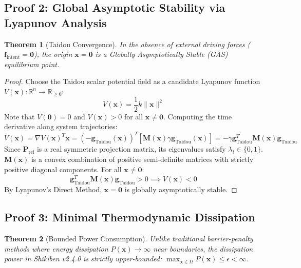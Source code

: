 \documentclass[11pt,a4paper]{article}
\newtheorem{theorem}{Theorem}
\begin{document}
\hr

\subsection{Proof 2: Global Asymptotic Stability via Lyapunov Analysis}

\begin{theorem}[Taidou Convergence]
In the absence of external driving forces ($\mathbf{f}_{\text{intent}} = \mathbf{0}$), the origin $\mathbf{x} = \mathbf{0}$ is a Globally Asymptotically Stable (GAS) equilibrium point.
\end{theorem}

\begin{proof}
Choose the Taidou scalar potential field as a candidate Lyapunov function $V(\mathbf{x}): \mathbb{R}^n \to \mathbb{R}_{\ge 0}$:
\begin{equation}
V(\mathbf{x}) = \frac{1}{2} k \|\mathbf{x}\|^2
\end{equation}
Note that $V(\mathbf{0}) = 0$ and $V(\mathbf{x}) > 0$ for all $\mathbf{x} \neq \mathbf{0}$. Computing the time derivative along system trajectories:
\begin{equation}
\dot{V}(\mathbf{x}) = \nabla V(\mathbf{x})^T \dot{\mathbf{x}} = (-\mathbf{g}_{\text{Taidou}}(\mathbf{x}))^T \left[ \mathbf{M}(\mathbf{x}) \gamma \mathbf{g}_{\text{Taidou}}(\mathbf{x}) \right] = -\gamma \mathbf{g}_{\text{Taidou}}^T \mathbf{M}(\mathbf{x}) \mathbf{g}_{\text{Taidou}}
\end{equation}
Since $\mathbf{P}_{\text{rei}}$ is a real symmetric projection matrix, its eigenvalues satisfy $\lambda_i \in \{0, 1\}$. $\mathbf{M}(\mathbf{x})$ is a convex combination of positive semi-definite matrices with strictly positive diagonal components. For all $\mathbf{x} \neq \mathbf{0}$:
\begin{equation}
\mathbf{g}_{\text{Taidou}}^T \mathbf{M}(\mathbf{x}) \mathbf{g}_{\text{Taidou}} > 0 \implies \dot{V}(\mathbf{x}) < 0
\end{equation}
By Lyapunov's Direct Method, $\mathbf{x} = \mathbf{0}$ is globally asymptotically stable.
\end{proof}

\hr

\subsection{Proof 3: Minimal Thermodynamic Dissipation}

\begin{theorem}[Bounded Power Consumption]
Unlike traditional barrier-penalty methods where energy dissipation $P(\mathbf{x}) \to \infty$ near boundaries, the dissipation power in Shikiben v2.4.0 is strictly upper-bounded: $\max_{\mathbf{x} \in \Omega} P(\mathbf{x}) \le \epsilon < \infty$.
\end{theorem}
\end{document}
